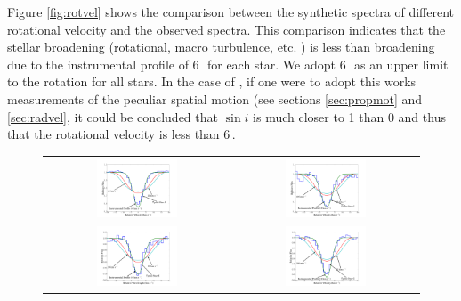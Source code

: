 Figure \ref{fig:rotvel} shows the comparison between the synthetic spectra of different rotational velocity and the observed spectra. This comparison indicates that the stellar broadening (rotational, macro turbulence, etc. ) is less than broadening due to the instrumental profile of 6\,\kms\ for each star. We adopt 6\,\kms\ as an upper limit to the rotation for all stars.
In the case of \starg, if one were to adopt this works measurements of the
peculiar spatial motion (see sections \ref{sec:propmot} and \ref{sec:radvel}, it could be concluded that $\sin{i}$ is much closer
to 1 than 0 and thus that the rotational velocity is less than 6\,\kms.



\begin{figure}[h!]
\begin{tabular}{cc}
\includegraphics[width=0.45\textwidth, trim=130 30 60 0]{chapter3/plots/stara_rotation.pdf} &
\includegraphics[width=0.45\textwidth, trim=130 30 60 0]{chapter3/plots/starc_rotation.pdf} \\
\includegraphics[width=0.45\textwidth, trim=130 30 60 0]{chapter3/plots/stare_rotation.pdf} &
\includegraphics[width=0.45\textwidth, trim=130 30 60 0]{chapter3/plots/starg_rotation.pdf} \\

\end{tabular}
\end{figure}
